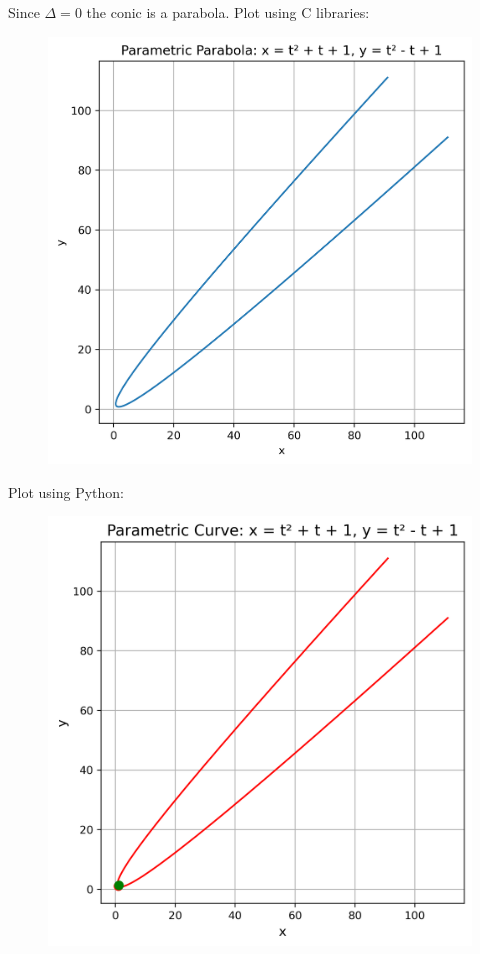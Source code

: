 \documentclass{beamer}
\numberwithin{equation}{section}
\begin{document}
Since $\Delta=0$ the conic is a parabola.
Plot using C libraries:
\begin{figure}[H]
	\centering
	\includegraphics[scale=0.5]{img1}
	\caption*{}
	\label{img1}
\end{figure}
Plot using Python:
\begin{figure}[H]
	\centering
	\includegraphics[scale=0.5]{img2}
	\caption*{}
	\label{img2}
\end{figure}
\end{document}
